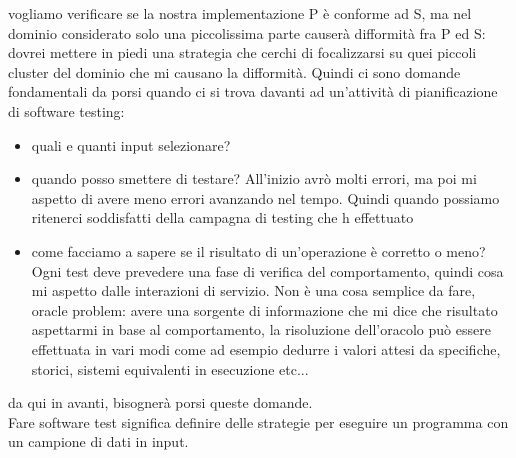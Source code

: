 \documentclass{article}
\begin{document}
vogliamo verificare se la nostra implementazione P è conforme ad S, ma nel dominio considerato solo una piccolissima parte causerà difformità fra P ed S: dovrei mettere in piedi una strategia che cerchi di focalizzarsi su quei piccoli cluster del dominio che mi causano la difformità. Quindi ci sono domande fondamentali da porsi quando ci si trova davanti ad un'attività di pianificazione di software testing:
\begin{itemize}
\item quali e quanti input selezionare?
\item quando posso smettere di testare? All'inizio avrò molti errori, ma poi mi aspetto di avere meno errori avanzando nel tempo. Quindi quando possiamo ritenerci soddisfatti della campagna di testing che h effettuato
\item come facciamo a sapere se il risultato di un'operazione è corretto o meno? Ogni test deve prevedere una fase di verifica del comportamento, quindi cosa mi aspetto dalle interazioni di servizio. Non è una cosa semplice da fare, oracle problem: avere una sorgente di informazione che mi dice che risultato aspettarmi in base al comportamento, la risoluzione dell'oracolo può essere effettuata in vari modi come ad esempio dedurre i valori attesi da specifiche, storici, sistemi equivalenti in esecuzione etc...
\end{itemize}
da qui in avanti, bisognerà porsi queste domande.\\ Fare software test significa definire delle strategie per eseguire un programma con un campione di dati in input.
\end{document}
